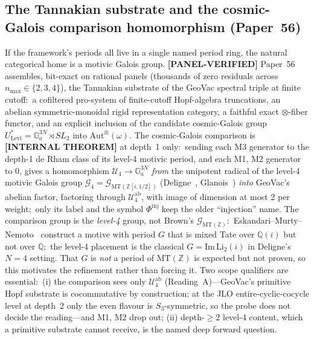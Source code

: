 \documentclass[aps,pra,twocolumn,superscriptaddress,longbibliography]{revtex4-2}
\begin{document}
\subsection{The Tannakian substrate and the cosmic-Galois comparison
homomorphism (Paper~56)}
If the framework's periods all live in a single named period ring, the
natural categorical home is a motivic Galois group.  \textbf{[PANEL-VERIFIED]} Paper~56 assembles,
bit-exact on rational panels (thousands of zero residuals across
$n_{\max} \in \{2, 3, 4\}$), the Tannakian substrate of the GeoVac
spectral triple at finite cutoff:\ a cofiltered pro-system of
finite-cutoff Hopf-algebra truncations, an abelian symmetric-monoidal
rigid representation category, a faithful exact $\otimes$-fiber functor,
and an explicit inclusion of the candidate cosmic-Galois group
$U^*_{\mathrm{Levi}} = \mathbb{G}_a^{3N} \rtimes SL_2$ into
$\mathrm{Aut}^{\otimes}(\omega)$.  The cosmic-Galois comparison is
\textbf{[INTERNAL THEOREM]} at depth~1 only:\ sending each M3 generator to the
depth-1 de Rham class of its level-4 motivic period, and each M1, M2 generator
to $0$, gives a homomorphism $\mathcal{U}_4 \to \mathbb{G}_a^{3N}$ \emph{from} the
unipotent radical of the level-4 motivic Galois group
$\mathcal{G}_4 = \mathcal{G}_{\mathrm{MT}(\mathbb{Z}[i, 1/2])}$
(Deligne~\cite{deligne2010}, Glanois~\cite{glanois2015}) \emph{into} GeoVac's abelian
factor, factoring through $\mathcal{U}_4^{\mathrm{ab}}$, with image of dimension at
most 2 per weight;\ only its label and the symbol $\Phi^{\mathrm{inj}}$ keep the
older ``injection'' name.  The comparison group is the
\emph{level-4} group, not Brown's $\mathcal{G}_{\mathrm{MT}(\mathbb{Z})}$:\
Eskandari--Murty--Nemoto~\cite{eskandari_murty_nemoto2025} construct a motive with period $G$ that
is mixed Tate over $\mathbb{Q}(i)$ but not over $\mathbb{Q}$;\ the level-4 placement is the classical
$G = \mathrm{Im}\,\mathrm{Li}_2(i)$ in Deligne's $N = 4$ setting.  That $G$ is \emph{not} a period of $\mathrm{MT}(\mathbb{Z})$
is expected but not proven, so this motivates the refinement rather than
forcing it.
Two scope qualifiers are essential:\ (i) the comparison sees only
$\mathcal{U}_4^{\mathrm{ab}}$ (Reading~A)---GeoVac's primitive Hopf substrate is
cocommutative by construction; at the JLO entire-cyclic-cocycle level at depth~2
only the even flavour is $S_3$-symmetric, so the probe does not decide the
reading---and M1, M2 drop out; (ii) depth-$\ge 2$ level-4 content, which a primitive
substrate cannot receive, is the named deep forward question.
\end{document}
